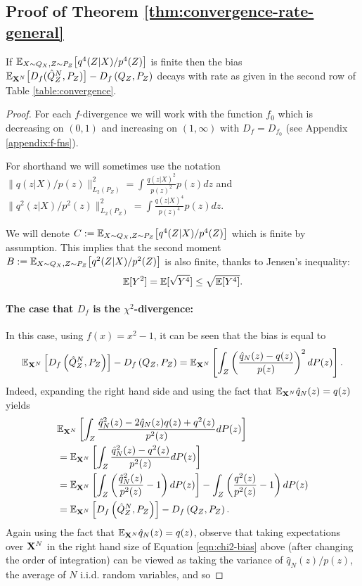 \subsection{Proof of Theorem \ref{thm:convergence-rate-general}}\label{proof:thm2}

\begin{theorem}
If $\mathbb{E}_{X\sim Q_X, Z\sim P_Z}\bigl[ q^4(Z|X) / p^4(Z) \bigr]$ is finite then
the bias $\mathbb{E}_{\mathbf{X}^N}\bigl[D_f( \hat{Q}_Z^N , P_Z)\bigr] - D_f\left( Q_{Z} , P_Z\right)$ decays with rate as given in the second row of Table \ref{table:convergence}.
\end{theorem}

\begin{proof}
For each $f$-divergence we will work with the function $f_0$ which is decreasing on $(0,1)$ and increasing on $(1, \infty)$ with $D_f = D_{f_0}$ (see Appendix \ref{appendix:f-fns}).

For shorthand we will sometimes use the notation $\| q(z|X)/p(z)\|^2_{L_2(P_Z)} = \int \frac{q(z|X)^2}{p(z)^2} p(z) dz$ and $\| q^2(z|X)/p^2(z)\|^2_{L_2(P_Z)} = \int \frac{q(z|X)^4}{p(z)^4} p(z) dz$.

We will denote $C:= \mathbb{E}_{X\sim Q_X, Z\sim P_Z}\bigl[ q^4(Z|X) / p^4(Z) \bigr]$ which is finite by assumption. 
This implies that the second moment $B:= \mathbb{E}_{X\sim Q_X, Z\sim P_Z}\bigl[ q^2(Z|X) / p^2(Z) \bigr]$ is also finite, thanks to Jensen's inequality: 
\[
\mathbb{E}[Y^2] = \mathbb{E}[\sqrt{Y^4}]\leq \sqrt{\mathbb{E}[Y^4]}.
\]

\paragraph{The case that $D_f$ is the $\chi^2$-divergence:}
% 
In this case, using $f(x) = x^2-1$, it can be seen that the bias is equal to
\begin{align}\label{eqn:chi2-bias}
    \mathbb{E}_{\mathbf{X}^N} \left[ D_{f}\left( \hat{Q}_Z^N , P_Z\right)\right] - D_{f}\left( Q_{Z} , P_Z\right) = \mathbb{E}_{\mathbf{X}^N}\left[ \int_Z  \left(\frac{\hat{q}_N(z) - q(z)}{p(z)}\right)^2 dP(z) \right].
\end{align}
Indeed, expanding the right hand side and using the fact that $\mathbb{E}_{\mathbf{X}^N}\hat{q}_N(z) = q(z)$ yields
\begin{align*}
    &\mathbb{E}_{\mathbf{X}^N}\left[ \int_Z  \frac{\hat{q}^2_N(z) - 2\hat{q}_N(z)q(z) + q^2(z)}{p^2(z)} dP(z) \right]\\
    &=\mathbb{E}_{\mathbf{X}^N}\left[ \int_Z  \frac{\hat{q}^2_N(z) - q^2(z)}{p^2(z)} dP(z) \right]\\
    &=\mathbb{E}_{\mathbf{X}^N}\left[ \int_Z  \left(\frac{\hat{q}^2_N(z)}{p^2(z)} - 1 \right)dP(z) \right] - \int_Z  \left(\frac{q^2(z)}{p^2(z)} - 1\right) dP(z)\\
    &= \mathbb{E}_{\mathbf{X}^N} \left[ D_{f}\left( \hat{Q}_Z^N , P_Z\right)\right] - D_{f}\left( Q_{Z} , P_Z\right).
\end{align*}
Again using the fact that $\mathbb{E}_{\mathbf{X}^N}\hat{q}_N(z) = q(z)$, observe that taking expectations over $\mathbf{X}^N$ in the right hand size of Equation \ref{eqn:chi2-bias} above (after changing the order of integration) can be viewed as taking the variance of $\hat{q}_N(z)/p(z)$, the average of $N$ i.i.d. random variables, and so


\end{proof}
